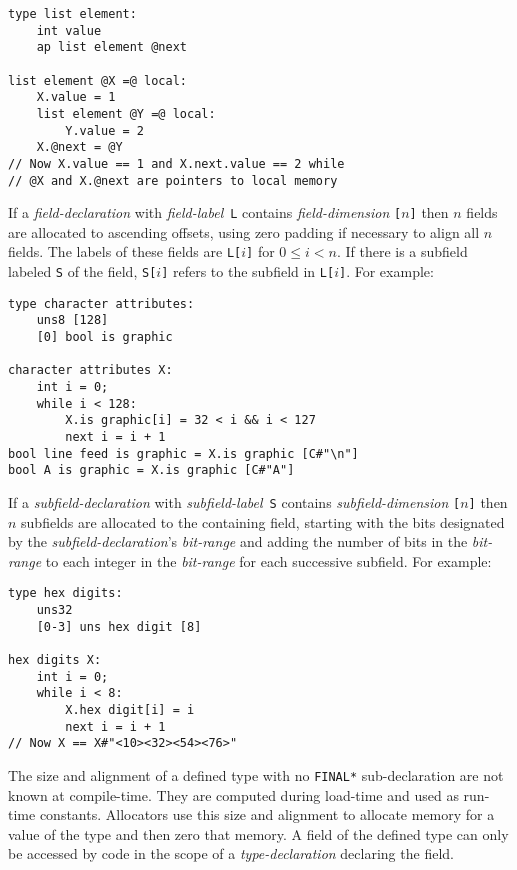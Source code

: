 \documentclass[12pt]{article}
\newenvironment{indpar}[1][0.3in]%
	{\begin{list}{}%
		     {\setlength{\itemsep}{0in}%
		      \setlength{\topsep}{0in}%
		      \setlength{\parsep}{1ex}%
		      \setlength{\labelwidth}{#1}%
		      \setlength{\leftmargin}{#1}%
		      \addtolength{\leftmargin}{\labelsep}}%
	 \item}%
	{\end{list}}
\begin{document}
\begin{indpar}\begin{verbatim}
type list element:
    int value
    ap list element @next

list element @X =@ local:
    X.value = 1
    list element @Y =@ local:
        Y.value = 2
    X.@next = @Y
// Now X.value == 1 and X.next.value == 2 while
// @X and X.@next are pointers to local memory
\end{verbatim}\end{indpar}

If a {\em field-declaration} with {\em field-label}\, {\tt L} contains 
{\em field-dimension} {\tt [$n$]} then $n$ fields are
allocated to ascending offsets, using zero padding
if necessary to align all $n$ fields.  The labels of these
fields are {\tt L[$i$]} for $0\le i<n$.  If there is a subfield
labeled {\tt S} of the field, {\tt S[$i$]} refers to the
subfield in {\tt L[$i$]}.  For example:

\begin{indpar}\begin{verbatim}
type character attributes:
    uns8 [128]
    [0] bool is graphic

character attributes X:
    int i = 0;
    while i < 128:
        X.is graphic[i] = 32 < i && i < 127
        next i = i + 1
bool line feed is graphic = X.is graphic [C#"\n"]
bool A is graphic = X.is graphic [C#"A"]
\end{verbatim}\end{indpar}

If a {\em subfield-declaration} with {\em subfield-label}\, {\tt S} contains 
{\em subfield-dimension} {\tt [$n$]} then $n$ subfields are
allocated to the containing field, starting with the bits
designated by the {\em subfield-declaration}'s {\em bit-range}
and adding the number of bits in the {\em bit-range} to each integer
in the {\em bit-range} for each successive subfield.
For example:

\begin{indpar}\begin{verbatim}
type hex digits:
    uns32
    [0-3] uns hex digit [8]

hex digits X:
    int i = 0;
    while i < 8:
        X.hex digit[i] = i
        next i = i + 1
// Now X == X#"<10><32><54><76>"
\end{verbatim}\end{indpar}

The size and alignment of a defined type with no {\tt *FINAL*}
sub-declaration are not known at compile-time.  They are computed
during load-time and used as run-time constants.
Allocators use this size and alignment to allocate memory for a value of
the type and then zero that memory.
A field of
the defined type can only be accessed by code in the scope
of a {\em type-declaration} declaring the field.
\end{document}

